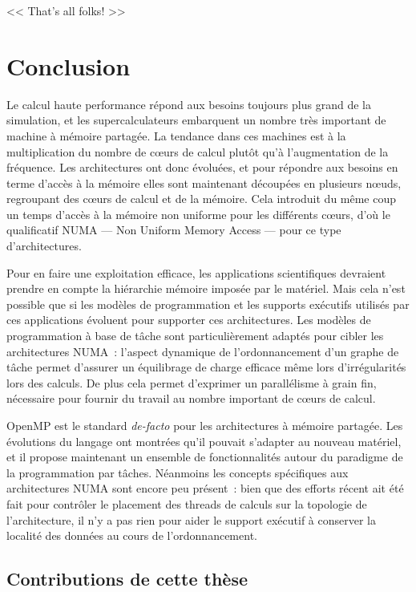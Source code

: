 \begin{savequote}[6cm]
<< That's all folks! >>
\end{savequote}

\chapter{Conclusion}\label{chap:conclusion}
\chaptertoc

Le calcul haute performance répond aux besoins toujours plus grand de la simulation, et les supercalculateurs embarquent un nombre très important de machine à mémoire partagée.
La tendance dans ces machines est à la multiplication du nombre de cœurs de calcul plutôt qu'à l'augmentation de la fréquence.
Les architectures ont donc évoluées, et pour répondre aux besoins en terme d'accès à la mémoire elles sont maintenant découpées en plusieurs nœuds, regroupant des cœurs de calcul et de la mémoire.
Cela introduit du même coup un temps d'accès à la mémoire non uniforme pour les différents cœurs, d'où le qualificatif NUMA --- Non Uniform Memory Access --- pour ce type d'architectures.

Pour en faire une exploitation efficace, les applications scientifiques devraient prendre en compte la hiérarchie mémoire imposée par le matériel.
Mais cela n'est possible que si les modèles de programmation et les supports exécutifs utilisés par ces applications évoluent pour supporter ces architectures.
Les modèles de programmation à base de tâche sont particulièrement adaptés pour cibler les architectures NUMA~: l'aspect dynamique de l'ordonnancement d'un graphe de tâche permet d'assurer un équilibrage de charge efficace même lors d'irrégularités lors des calculs.
De plus cela permet d'exprimer un parallélisme à grain fin, nécessaire pour fournir du travail au nombre important de cœurs de calcul.

OpenMP est le standard \emph{de-facto} pour les architectures à mémoire partagée.
Les évolutions du langage ont montrées qu'il pouvait s'adapter au nouveau matériel, et il propose maintenant un ensemble de fonctionnalités autour du paradigme de la programmation par tâches.
Néanmoins les concepts spécifiques aux architectures NUMA sont encore peu présent~: bien que des efforts récent ait été fait pour contrôler le placement des threads de calculs sur la topologie de l'architecture, il n'y a pas rien pour aider le support exécutif à conserver la localité des données au cours de l'ordonnancement.

\section*{Contributions de cette thèse}

